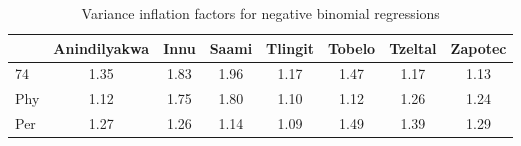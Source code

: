 \begin{table}[!h]
\centering
\caption{Variance inflation factors for negative binomial regressions}
\centering
\begin{tabular}[t]{lccccccc}
\toprule
  & Anindilyakwa & Innu & Saami & Tlingit & Tobelo & Tzeltal & Zapotec\\
\midrule
74 & 1.35 & 1.83 & 1.96 & 1.17 & 1.47 & 1.17 & 1.13\\
Phy & 1.12 & 1.75 & 1.80 & 1.10 & 1.12 & 1.26 & 1.24\\
Per & 1.27 & 1.26 & 1.14 & 1.09 & 1.49 & 1.39 & 1.29\\
\bottomrule
\end{tabular}
\end{table}
